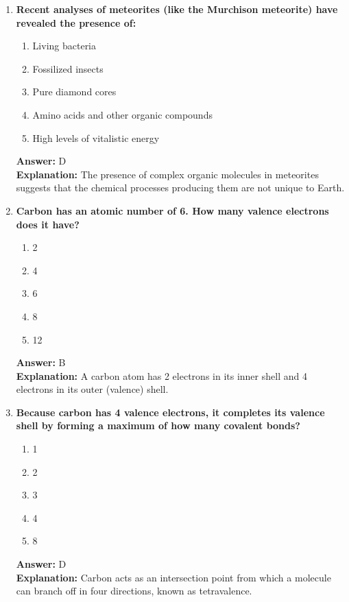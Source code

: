 \documentclass[11pt, a4paper]{article}
\begin{document}
\begin{enumerate}
\item \textbf{Recent analyses of meteorites (like the Murchison meteorite) have revealed the presence of:}
\begin{enumerate}[label=\Alph*.]
    \item Living bacteria
    \item Fossilized insects
    \item Pure diamond cores
    \item Amino acids and other organic compounds
    \item High levels of vitalistic energy
\end{enumerate}
\textbf{Answer:} D \\
\textbf{Explanation:} The presence of complex organic molecules in meteorites suggests that the chemical processes producing them are not unique to Earth.


\item \textbf{Carbon has an atomic number of 6. How many valence electrons does it have?}
\begin{enumerate}[label=\Alph*.]
    \item 2
    \item 4
    \item 6
    \item 8
    \item 12
\end{enumerate}
\textbf{Answer:} B \\
\textbf{Explanation:} A carbon atom has 2 electrons in its inner shell and 4 electrons in its outer (valence) shell.

\item \textbf{Because carbon has 4 valence electrons, it completes its valence shell by forming a maximum of how many covalent bonds?}
\begin{enumerate}[label=\Alph*.]
    \item 1
    \item 2
    \item 3
    \item 4
    \item 8
\end{enumerate}
\textbf{Answer:} D \\
\textbf{Explanation:} Carbon acts as an intersection point from which a molecule can branch off in four directions, known as tetravalence.


\end{enumerate}
\end{document}
